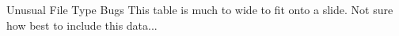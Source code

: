 \documentclass[pdf]{beamer}
\newcommand{\tickmark}{\ding{51}}
\begin{document}
\begin{frame}{Unusual File Type Bugs}
  This table is much to wide to fit onto a slide.  Not sure how best to
  include this data...
\end{frame}
\end{document}
